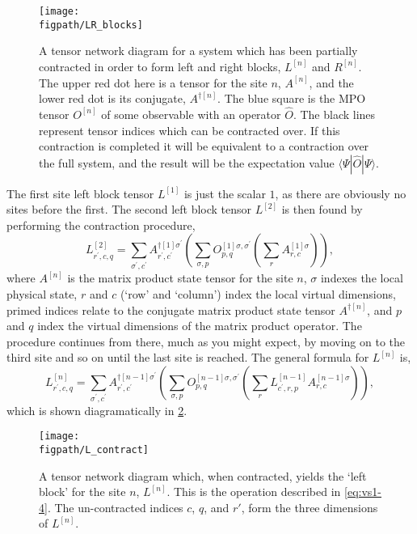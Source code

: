 \begin{figure}[ht!]
\centering
\texttt{[image: \\figpath/LR\_blocks]}
\caption{A tensor network diagram for a system which has been partially contracted in order to form left and right blocks, \(L^{[n]}\) and \(R^{[n]}\). The upper red dot here is a tensor for the site \(n\), \(A^{[n]}\), and the lower red dot is its conjugate, \(A^{\dagger [n]}\). The blue square is the MPO tensor \(O^{[n]}\) of some observable with an operator \(\hat{O}\). The black lines represent tensor indices which can be contracted over. If this contraction is completed it will be equivalent to a contraction over the full system, and the result will be the expectation value \(\langle \Psi | \hat{O} | \Psi \rangle \).}
\label{fig:vs1-2}
\end{figure}

The first site left block tensor \(L^{[1]}\) is just the scalar \(1\), as there are obviously no sites before the first. The second left block tensor \(L^{[2]}\) is then found by performing the contraction procedure,
\begin{equation}
L^{[2]}_{r^{\prime}, c, q} = \sum_{\sigma^{\prime}, c^{\prime}} A^{\dagger [1] \sigma^{\prime}}_{r^{\prime}, c^{\prime}} \left( \sum_{\sigma, p} O^{[1]  \sigma, \sigma^{\prime}}_{p, q} \left( \sum_{r} A^{[1] \sigma}_{r, c} \right) \right),
\label{eq:vs1-3}
\end{equation}
where \(A^{[n]}\) is the matrix product state tensor for the site \(n\), \(\sigma\) indexes the local physical state, \(r\) and \(c\) (`row' and `column') index the local virtual dimensions, primed indices relate to the conjugate matrix product state tensor \(A^{\dagger [n]}\), and \(p\) and \(q\) index the virtual dimensions of the matrix product operator. The procedure continues from there, much as you might expect, by moving on to the third site and so on until the last site is reached. The general formula for \(L^{[n]}\) is,
\begin{equation}
L^{[n]}_{r^{\prime}, c, q} = \sum_{\sigma^{\prime}, c^{\prime}} A^{\dagger [n-1] \sigma^{\prime}}_{r^{\prime}, c^{\prime}} \left( \sum_{\sigma, p} O^{[n-1]  \sigma, \sigma^{\prime}}_{p, q} \left( \sum_{r} L^{[n-1]}_{c^{\prime}, r, p} A^{[n-1] \sigma}_{r, c} \right) \right),
\label{eq:vs1-4}
\end{equation}
which is shown diagramatically in \cref{fig:vsTMP}.

\begin{figure}[ht!]
\centering
\texttt{[image: \\figpath/L\_contract]}
\caption{A tensor network diagram which, when contracted, yields the `left block' for the site \(n\), \(L^{[n]}\). This is the operation described in \cref{eq:vs1-4}. The un-contracted indices \(c\), \(q\), and \(r'\), form the three dimensions of \(L^{[n]}\).}
\label{fig:vsTMP}
\end{figure}

